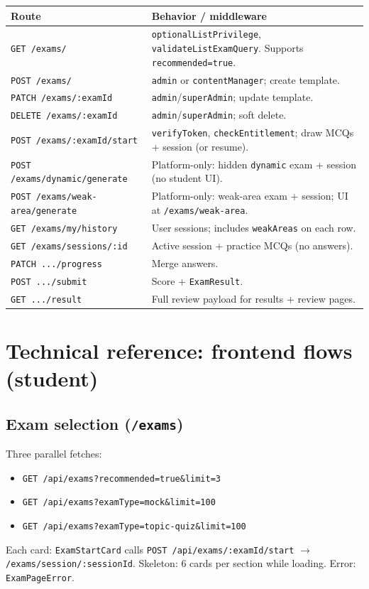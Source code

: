 \documentclass[11pt,a4paper]{article}
\begin{document}
\begin{longtable}{@{}p{}p{}@{}}
\toprule
\textbf{Route} & \textbf{Behavior / middleware} \\
\midrule
\endhead
\texttt{GET /exams/} & \texttt{optionalListPrivilege}, \texttt{validateListExamQuery}. Supports \texttt{recommended=true}. \\
\texttt{POST /exams/} & \texttt{admin} or \texttt{contentManager}; create template. \\
\texttt{PATCH /exams/:examId} & \texttt{admin}/\texttt{superAdmin}; update template. \\
\texttt{DELETE /exams/:examId} & \texttt{admin}/\texttt{superAdmin}; soft delete. \\
\texttt{POST /exams/:examId/start} & \texttt{verifyToken}, \texttt{checkEntitlement}; draw MCQs + session (or resume). \\
\texttt{POST /exams/dynamic/generate} & Platform-only: hidden \texttt{dynamic} exam + session (no student UI). \\
\texttt{POST /exams/weak-area/generate} & Platform-only: weak-area exam + session; UI at \texttt{/exams/weak-area}. \\
\texttt{GET /exams/my/history} & User sessions; includes \texttt{weakAreas} on each row. \\
\texttt{GET /exams/sessions/:id} & Active session + practice MCQs (no answers). \\
\texttt{PATCH .../progress} & Merge answers. \\
\texttt{POST .../submit} & Score + \texttt{ExamResult}. \\
\texttt{GET .../result} & Full review payload for results + review pages. \\
\bottomrule
\end{longtable}

\section{Technical reference: frontend flows (student)}

\subsection{Exam selection (\texttt{/exams})}

Three parallel fetches:
\begin{itemize}[nosep]
  \item \texttt{GET /api/exams?recommended=true\&limit=3}
  \item \texttt{GET /api/exams?examType=mock\&limit=100}
  \item \texttt{GET /api/exams?examType=topic-quiz\&limit=100}
\end{itemize}
Each card: \texttt{ExamStartCard} calls \texttt{POST /api/exams/:examId/start} $\rightarrow$ \texttt{/exams/session/:sessionId}. Skeleton: 6 cards per section while loading. Error: \texttt{ExamPageError}.
\end{document}

